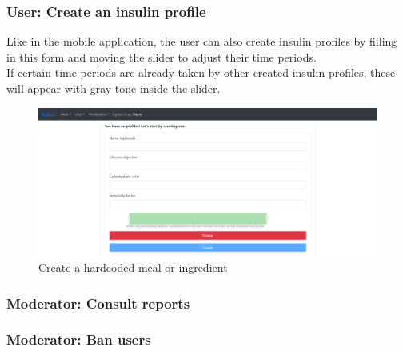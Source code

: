 \subsubsection{User: Create an insulin profile}

Like in the mobile application, the user can also create insulin profiles by filling in this form 
and moving the slider to adjust their time periods.\\

If certain time periods are already taken by other created insulin profiles, these will appear with
gray tone inside the slider.\\

\begin{figure}[H]
    \begin{center}
        \includegraphics[scale=0.4]{_figures/web-insulin-profile-creation.png}
        \caption{Create a hardcoded meal or ingredient}
    \end{center}
\end{figure}

\subsubsection{Moderator: Consult reports}

\subsubsection{Moderator: Ban users}
